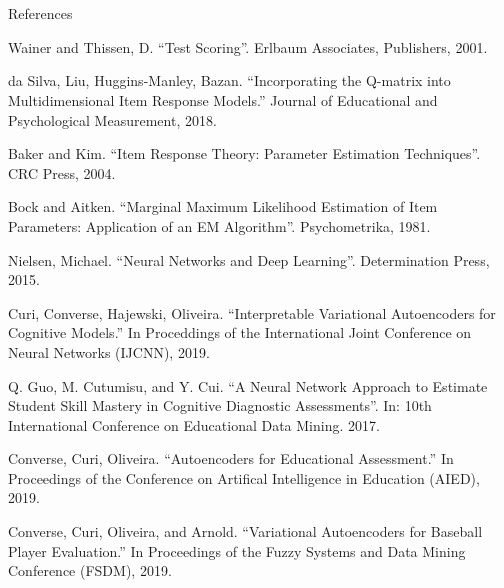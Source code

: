 \documentclass{beamer}
\theoremstyle{definition}
\begin{document}
\section{}
\begin{frame}{References}
\begin{thebibliography}{2}
\tiny

 Wainer and Thissen, D. ``Test Scoring''. Erlbaum Associates, Publishers, 2001.

 da Silva, Liu, Huggins-Manley, Bazan. ``Incorporating the Q-matrix into Multidimensional Item Response Models.'' Journal of Educational and Psychological Measurement, 2018.

 Baker and Kim. ``Item Response Theory: Parameter Estimation Techniques''. CRC Press, 2004.

 Bock and Aitken. ``Marginal Maximum Likelihood Estimation of Item Parameters: Application of an EM Algorithm''. Psychometrika, 1981.

 Nielsen, Michael. ``Neural Networks and Deep Learning''. Determination Press, 2015.

 Curi, Converse, Hajewski, Oliveira. ``Interpretable Variational Autoencoders for Cognitive Models.'' In Proceddings of the International Joint Conference on Neural Networks (IJCNN), 2019.

 Q. Guo, M. Cutumisu, and Y. Cui. ``A Neural Network Approach to Estimate Student Skill Mastery in Cognitive Diagnostic Assessments''. In: 10th International Conference on Educational Data Mining. 2017.

 Converse, Curi, Oliveira. ``Autoencoders for Educational Assessment.'' In Proceedings of the Conference on Artifical Intelligence in Education (AIED), 2019.

 Converse, Curi, Oliveira, and Arnold. ``Variational Autoencoders for Baseball Player Evaluation.'' In Proceedings of the Fuzzy Systems and Data Mining Conference (FSDM), 2019.  


\end{thebibliography}
\end{frame}

\begin{frame}
  \titlepage
\end{frame}
\end{document}
